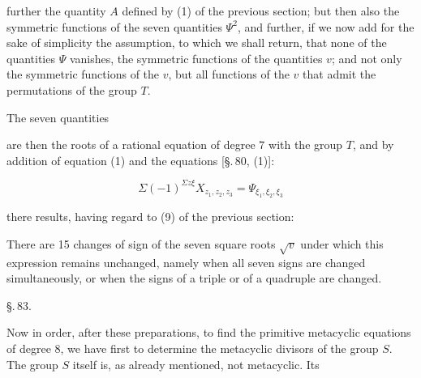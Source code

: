 further the quantity $A$ defined by (1) of the previous section; but then also the symmetric functions of the seven quantities $\Psi^2$, and further, if we now add for the sake of simplicity the assumption, to which we shall return, that none of the quantities $\Psi$ vanishes, the symmetric functions of the quantities $v$; and not only the symmetric functions of the $v$, but all functions of the $v$ that admit the permutations of the group $T$.

The seven quantities


are then the roots of a rational equation of degree $7$ with the group $T$, and by addition of equation (1) and the equations [\S.\,80, (1)]:

\[
\Sigma (-1)^{\Sigma z\xi} X_{z_1, z_2, z_3} = \Psi_{\xi_1, \xi_2, \xi_3}
\]

there results, having regard to (9) of the previous section:


There are 15 changes of sign of the seven square roots $\sqrt{v}$ under which this expression remains unchanged, namely when all seven signs are changed simultaneously, or when the signs of a triple or of a quadruple are changed. 

\begin{center}
\S.\,83.

\end{center}

Now in order, after these preparations, to find the primitive metacyclic equations of degree $8$, we have first to determine the metacyclic divisors of the group $S$. The group $S$ itself is, as already mentioned, not metacyclic. Its
